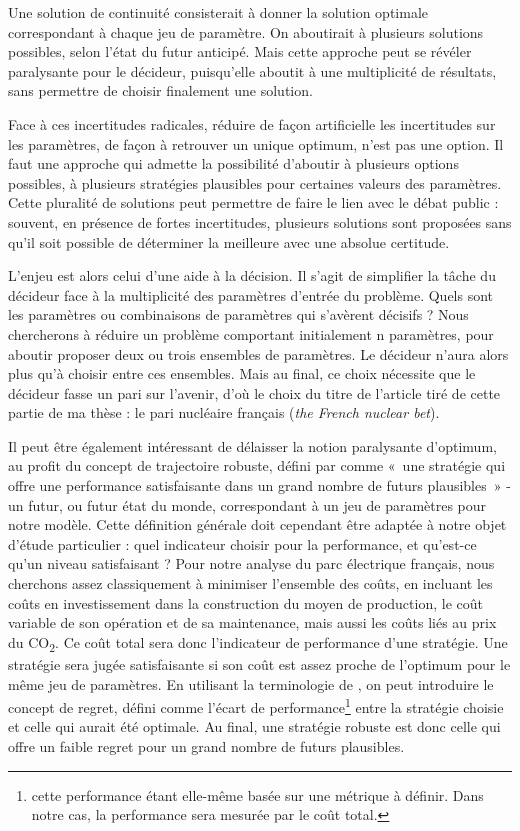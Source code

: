 Une solution de continuité consisterait à donner la solution optimale correspondant à chaque jeu de paramètre. On aboutirait à plusieurs solutions possibles, selon l'état du futur anticipé. Mais cette approche peut se révéler paralysante pour le décideur, puisqu'elle aboutit à une multiplicité de résultats, sans permettre de choisir finalement une solution.

Face à ces incertitudes radicales, réduire de façon artificielle les incertitudes sur les paramètres, de façon à retrouver un unique optimum, n’est pas une option. Il faut une approche qui admette la possibilité d’aboutir à plusieurs options possibles, à plusieurs stratégies plausibles pour certaines valeurs des paramètres. Cette pluralité de solutions peut permettre de faire le lien avec le débat public : souvent, en présence de fortes incertitudes, plusieurs solutions sont proposées sans qu’il soit possible de déterminer la meilleure avec une absolue certitude. 

L’enjeu est alors celui d’une aide à la décision. Il s’agit de simplifier la tâche du décideur face à la multiplicité des paramètres d’entrée du problème. Quels sont les paramètres ou combinaisons de paramètres qui s’avèrent décisifs ? Nous chercherons à réduire un problème comportant initialement n paramètres, pour aboutir proposer deux ou trois ensembles de paramètres. Le décideur n’aura alors plus qu’à choisir entre ces ensembles. Mais au final, ce choix nécessite que le décideur fasse un pari sur l’avenir, d’où le choix du titre de l’article tiré de cette partie de ma thèse : le pari nucléaire français (\textit{the French nuclear bet}).

Il peut être également intéressant de délaisser la notion paralysante d’optimum, au profit du concept de trajectoire robuste, défini par \citet{Lempert2006} comme «~une stratégie qui offre une performance satisfaisante dans un grand nombre de futurs plausibles~» - un futur, ou futur état du monde, correspondant à un jeu de paramètres pour notre modèle.
Cette définition générale doit cependant être adaptée à notre objet d’étude particulier : quel indicateur choisir pour la performance, et qu’est-ce qu’un niveau satisfaisant ?
Pour notre analyse du parc électrique français, nous cherchons assez classiquement à minimiser l'ensemble des coûts, en incluant les coûts en investissement dans la construction du moyen de production, le coût variable de son opération et de sa maintenance, mais aussi les coûts liés au prix du CO\textsubscript{2}. Ce coût total sera donc l’indicateur de performance d’une stratégie.
Une stratégie sera jugée satisfaisante si son coût est assez proche de l’optimum pour le même jeu de paramètres. En utilisant la terminologie de \citet{Savage1950}, on peut introduire le concept de regret, défini comme l’écart de performance\footnote{cette performance étant elle-même basée sur une métrique à définir. Dans notre cas, la performance sera mesurée par le coût total.} entre la stratégie choisie et celle qui aurait été optimale. Au final, une stratégie robuste est donc celle qui offre un faible regret pour un grand nombre de futurs plausibles.

